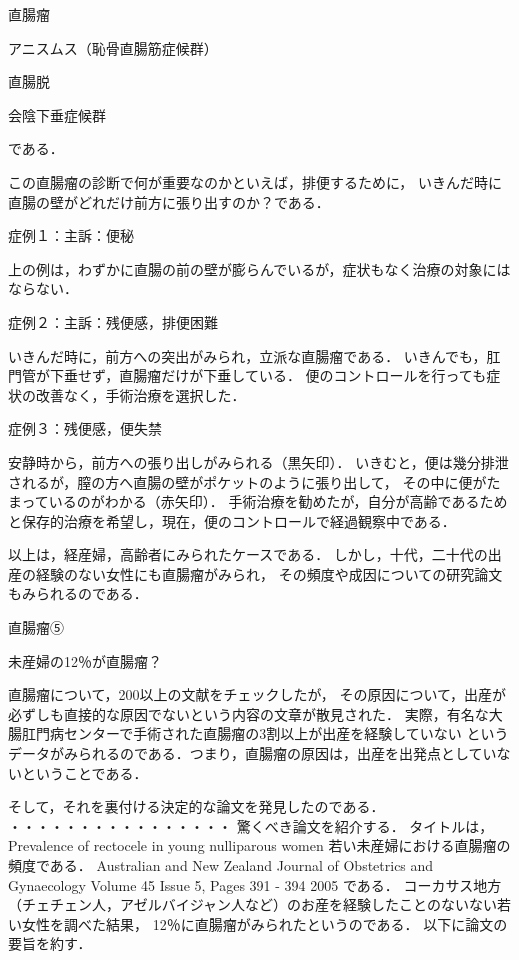 直腸瘤

アニスムス（恥骨直腸筋症候群）

直腸脱

会陰下垂症候群

である．

この直腸瘤の診断で何が重要なのかといえば，排便するために，
いきんだ時に直腸の壁がどれだけ前方に張り出すのか？である．

症例１：主訴：便秘




上の例は，わずかに直腸の前の壁が膨らんでいるが，症状もなく治療の対象にはならない．

症例２：主訴：残便感，排便困難




いきんだ時に，前方への突出がみられ，立派な直腸瘤である．
いきんでも，肛門管が下垂せず，直腸瘤だけが下垂している．
便のコントロールを行っても症状の改善なく，手術治療を選択した．

症例３：残便感，便失禁




安静時から，前方への張り出しがみられる（黒矢印）．
いきむと，便は幾分排泄されるが，膣の方へ直腸の壁がポケットのように張り出して，
その中に便がたまっているのがわかる（赤矢印）．
手術治療を勧めたが，自分が高齢であるためと保存的治療を希望し，現在，便のコントロールで経過観察中である．

以上は，経産婦，高齢者にみられたケースである．
しかし，十代，二十代の出産の経験のない女性にも直腸瘤がみられ，
その頻度や成因についての研究論文もみられるのである．

直腸瘤⑤

未産婦の12％が直腸瘤？

直腸瘤について，200以上の文献をチェックしたが，
その原因について，出産が必ずしも直接的な原因でないという内容の文章が散見された．
実際，有名な大腸肛門病センターで手術された直腸瘤の3割以上が出産を経験していない
というデータがみられるのである．つまり，直腸瘤の原因は，出産を出発点としていないということである．

そして，それを裏付ける決定的な論文を発見したのである．
・・・・・・・・・・・・・・・・
驚くべき論文を紹介する．
タイトルは，Prevalence of rectocele in young nulliparous women 若い未産婦における直腸瘤の頻度である．
Australian and New Zealand Journal of Obstetrics and Gynaecology Volume 45 Issue 5, Pages 391 - 394 2005
である．
コーカサス地方（チェチェン人，アゼルバイジャン人など）のお産を経験したことのないない若い女性を調べた結果，
12％に直腸瘤がみられたというのである．
以下に論文の要旨を約す．

